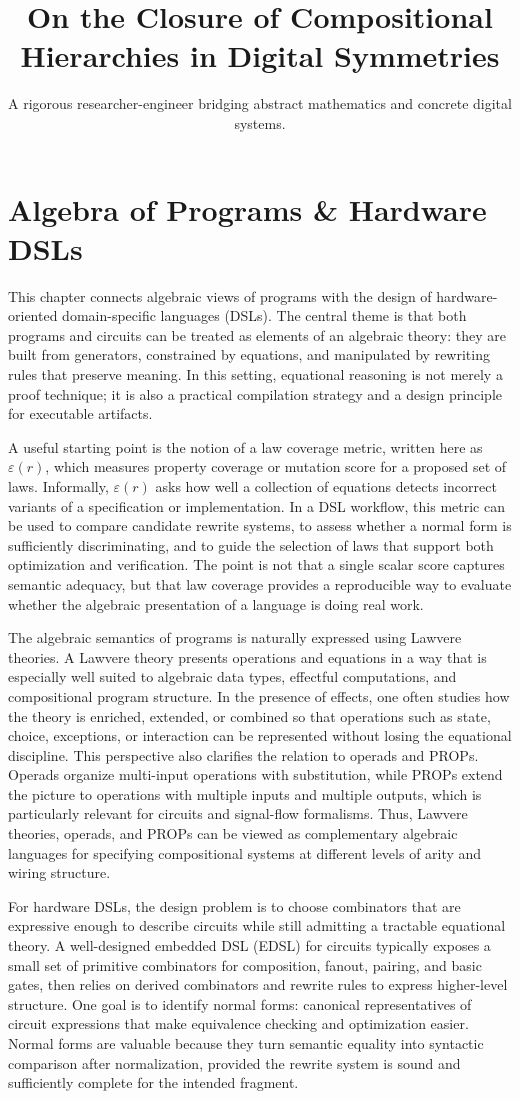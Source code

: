 \documentclass[11pt]{article}
\title{On the Closure of Compositional Hierarchies in Digital Symmetries}
\author{A rigorous researcher-engineer bridging abstract mathematics and concrete digital systems.}
\begin{document}
\section*{Algebra of Programs \& Hardware DSLs}

This chapter connects algebraic views of programs with the design of hardware-oriented domain-specific languages (DSLs). The central theme is that both programs and circuits can be treated as elements of an algebraic theory: they are built from generators, constrained by equations, and manipulated by rewriting rules that preserve meaning. In this setting, equational reasoning is not merely a proof technique; it is also a practical compilation strategy and a design principle for executable artifacts.

A useful starting point is the notion of a law coverage metric, written here as \(\varepsilon(r)\), which measures property coverage or mutation score for a proposed set of laws. Informally, \(\varepsilon(r)\) asks how well a collection of equations detects incorrect variants of a specification or implementation. In a DSL workflow, this metric can be used to compare candidate rewrite systems, to assess whether a normal form is sufficiently discriminating, and to guide the selection of laws that support both optimization and verification. The point is not that a single scalar score captures semantic adequacy, but that law coverage provides a reproducible way to evaluate whether the algebraic presentation of a language is doing real work.

The algebraic semantics of programs is naturally expressed using Lawvere theories. A Lawvere theory presents operations and equations in a way that is especially well suited to algebraic data types, effectful computations, and compositional program structure. In the presence of effects, one often studies how the theory is enriched, extended, or combined so that operations such as state, choice, exceptions, or interaction can be represented without losing the equational discipline. This perspective also clarifies the relation to operads and PROPs. Operads organize multi-input operations with substitution, while PROPs extend the picture to operations with multiple inputs and multiple outputs, which is particularly relevant for circuits and signal-flow formalisms. Thus, Lawvere theories, operads, and PROPs can be viewed as complementary algebraic languages for specifying compositional systems at different levels of arity and wiring structure.

For hardware DSLs, the design problem is to choose combinators that are expressive enough to describe circuits while still admitting a tractable equational theory. A well-designed embedded DSL (EDSL) for circuits typically exposes a small set of primitive combinators for composition, fanout, pairing, and basic gates, then relies on derived combinators and rewrite rules to express higher-level structure. One goal is to identify normal forms: canonical representatives of circuit expressions that make equivalence checking and optimization easier. Normal forms are valuable because they turn semantic equality into syntactic comparison after normalization, provided the rewrite system is sound and sufficiently complete for the intended fragment.
\end{document}

